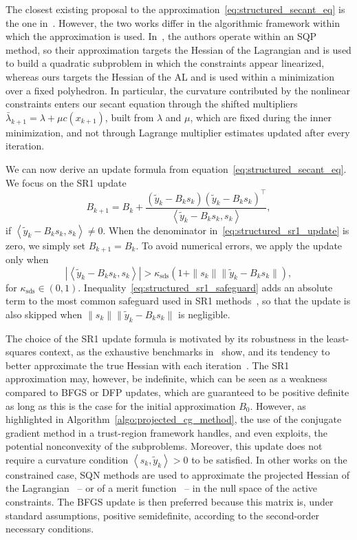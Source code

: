 \documentclass{article}
\numberwithin{equation}{section}
\newcommand{\inner}[2]{\left\langle {#1} , {#2} \right\rangle} %
\theoremstyle{plain}
\begin{document}
The closest existing proposal to the approximation~\eqref{eq:structured_secant_eq}  is the one in~\cite{li-etal:2002}. However, the two works differ in the algorithmic framework within which the approximation is used. In~\cite{li-etal:2002}, the authors operate within an SQP method, so their approximation targets the Hessian of the Lagrangian and is used to build a quadratic subproblem in which the constraints appear linearized, whereas ours targets the Hessian of the AL and is used within a minimization over a fixed polyhedron. In particular, the curvature contributed by the nonlinear constraints enters our secant equation through the shifted multipliers $\bar{\lambda}_{k+1} = \lambda + \mu c(x_{k+1})$, built from $\lambda$ and $\mu$, which are fixed during the inner minimization, and not through Lagrange multiplier estimates updated after every iteration.


We can now derive an update formula from equation~\eqref{eq:structured_secant_eq}. We focus on the SR1 update
\begin{equation}\label{eq:structured_sr1_update}
	B_{k+1} = B_k + \dfrac{(\tilde{y}_k-B_ks_k)(\tilde{y}_k-B_ks_k)^\top}{\inner{\tilde{y}_k-B_ks_k}{s_k}},
\end{equation}
if $\inner{\tilde{y}_k-B_ks_k}{s_k} \neq 0$. When the denominator in~\eqref{eq:structured_sr1_update} is zero, we simply set $B_{k+1}=B_k$. To avoid numerical errors, we apply the update only when
\begin{equation}\label{eq:structured_sr1_safeguard}
	\left|\inner{\tilde{y}_k-B_ks_k}{s_k}\right| > \kappa_{\mathrm{sds}}\left(1 + \|s_k\|\|\tilde{y}_k-B_ks_k\|\right),
\end{equation}
for $\kappa_{\mathrm{sds}} \in (0,1)$. Inequality~\eqref{eq:structured_sr1_safeguard} adds an absolute term to the most common safeguard used in SR1 methods~\cite[Section~6.2]{nocedalwright:2006}, so that the update is also skipped when $\|s_k\|\|\tilde{y}_k-B_ks_k\|$ is negligible.

The choice of the SR1 update formula is motivated by its robustness in the least-squares context, as the exhaustive benchmarks in~\cite{lucksan-etal:2019} show, and its tendency to better approximate the true Hessian with each iteration~\cite{conn-etal:1991a}. The SR1 approximation may, however, be indefinite, which can be seen as a weakness compared to BFGS or DFP updates, which are guaranteed to be positive definite as long as this is the case for the initial approximation $B_0$. However, as highlighted in Algorithm~\ref{algo:projected_cg_method}, the use of the conjugate gradient method in a trust-region framework handles, and even exploits, the potential nonconvexity of the subproblems. Moreover, this update does not require a curvature condition $\inner{s_k}{\tilde{y}_k} > 0$ to be satisfied. In other works on the constrained case, SQN methods are used to approximate the projected Hessian of the Lagrangian~\cite{tjoabiegler:1991} -- or of a merit function~\cite{amiribartels:1989} -- in the null space of the active constraints. The BFGS update is then preferred because this matrix is, under standard assumptions, positive semidefinite, according to the second-order necessary conditions.
\end{document}
